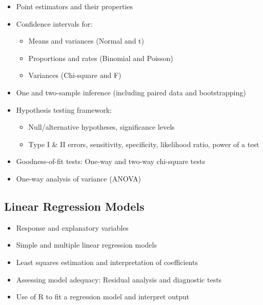 \documentclass[
  a4paper,
  DIV=11,
  numbers=noendperiod,
  oneside]{scrreprt}
\providecommand{\tightlist}{%
  \setlength{\itemsep}{0pt}\setlength{\parskip}{0pt}}
\theoremstyle{definition}
\theoremstyle{definition}
\theoremstyle{plain}
\theoremstyle{plain}
\theoremstyle{definition}
\theoremstyle{remark}
\begin{document}
\begin{itemize}
\tightlist
\item
  Point estimators and their properties\\
\item
  Confidence intervals for:

  \begin{itemize}
  \tightlist
  \item
    Means and variances (Normal and t)\\
  \item
    Proportions and rates (Binomial and Poisson)\\
  \item
    Variances (Chi-square and F)\\
  \end{itemize}
\item
  One and two-sample inference (including paired data and
  bootstrapping)\\
\item
  Hypothesis testing framework:

  \begin{itemize}
  \tightlist
  \item
    Null/alternative hypotheses, significance levels\\
  \item
    Type I \& II errors, sensitivity, specificity, likelihood ratio,
    power of a test\\
  \end{itemize}
\item
  Goodness-of-fit tests: One-way and two-way chi-square tests\\
\item
  One-way analysis of variance (ANOVA)
\end{itemize}

\subsection*{Linear Regression Models}\label{linear-regression-models}

\begin{itemize}
\tightlist
\item
  Response and explanatory variables\\
\item
  Simple and multiple linear regression models\\
\item
  Least squares estimation and interpretation of coefficients\\
\item
  Assessing model adequacy: Residual analysis and diagnostic tests\\
\item
  Use of R to fit a regression model and interpret output
\end{itemize}
\end{document}
